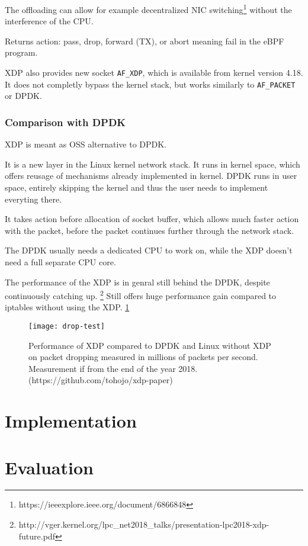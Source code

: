 The offloading can allow for example decentralized NIC switching\footnote{https://ieeexplore.ieee.org/document/6866848} without the interference of the CPU.

Returns action: pass, drop, forward (TX), or abort meaning fail in the eBPF program.

XDP also provides new socket \texttt{AF\_XDP}, which is available from kernel version 4.18.
It does not completly bypass the kernel stack, but works similarly to \texttt{AF\_PACKET} or DPDK.


\subsection{Comparison with DPDK}
XDP is meant as OSS alternative to DPDK.

It is a new layer in the Linux kernel network stack.
It runs in kernel space, which offers reusage of mechanisms already implemented in kernel.
DPDK runs in user space, entirely skipping the kernel and thus the user needs to implement everyting there.

It takes action before allocation of socket buffer, which allows much faster action with the packet, before the packet continues further through the network stack.

The DPDK usually needs a dedicated CPU to work on, while the XDP doesn't need a full separate CPU core.

The performance of the XDP is in genral still behind the DPDK, despite continuously catching up.
\footnote{http://vger.kernel.org/lpc\_net2018\_talks/presentation-lpc2018-xdp-future.pdf}
Still offers huge performance gain compared to iptables without using the XDP.
\ref{fig:drop-test}

\begin{figure}
  \centering
  \texttt{[image: drop-test]}
  \caption{Performance of XDP compared to DPDK and Linux without XDP on packet dropping measured in millions of packets per second. Measurement if from the end of the year 2018. (https://github.com/tohojo/xdp-paper)}
  \label{fig:drop-test}
\end{figure}

\chapter{Implementation}

\chapter{Evaluation}
